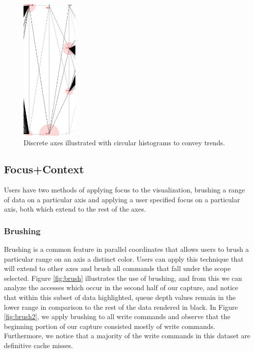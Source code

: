 \documentclass[journal]{vgtc}                %
\begin{document}
\begin{figure}[h!]
 \centering
 \includegraphics[width=0.25\textwidth]{images/discrete.eps}
 \caption{Discrete axes illustrated with circular histograms to convey trends.}
 \label{fig:histograms}
\end{figure}

\subsection{Focus+Context}
Users have two methods of applying focus to the visualization, brushing a range of data on a particular axis and applying a user specified focus on a particular axis, both which extend to the rest of the axes.

\subsubsection{Brushing}
Brushing is a common feature in parallel coordinates that allows users to brush a particular range on an axis a distinct color. Users can apply this technique that will extend to other axes and brush all commands that fall under the scope selected. Figure \ref{fig:brush} illustrates the use of brushing, and from this we can analyze the accesses which occur in the second half of our capture, and notice that within this subset of data highlighted, queue depth values remain in the lower range in comparison to the rest of the data rendered in black. In Figure \ref{fig:brush2}, we apply brushing to all write commands and observe that the beginning portion of our capture consisted mostly of write commands. Furthermore, we notice that a majority of the write commands in this dataset are definitive cache misses.
\end{document}
